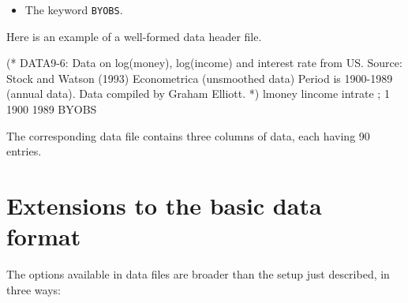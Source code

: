 \begin{enumerate}
\begin{itemize}
\item The keyword
		\verb+BYOBS+.


\end{itemize}


\end{enumerate}

Here is an example of a well-formed data header file.

	
\begin{code} 
	  (* 
	  DATA9-6: 
	  Data on log(money), log(income) and interest rate from US. 
	  Source: Stock and Watson (1993) Econometrica 
	  (unsmoothed data) Period is 1900-1989 (annual data). 
	  Data compiled by Graham Elliott. 
	  *) 
	  lmoney lincome intrate ; 
	  1 1900 1989 BYOBS
\end{code}



	The corresponding data file contains three columns of data, each
	having 90 entries.



\section{Extensions to the basic data
	format}
\label{extensions}


	The options available in  data
	files are broader than the setup just described, in three
	ways:
      


